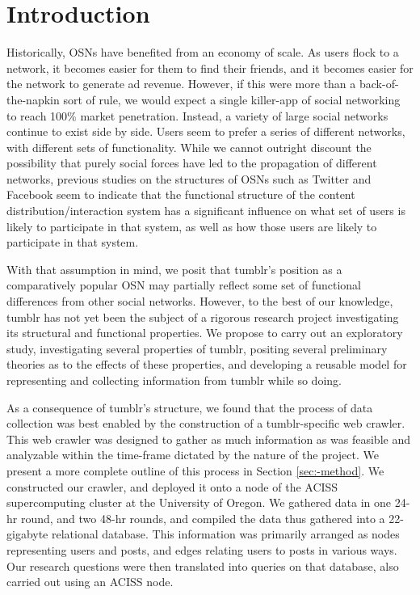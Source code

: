 \section{Introduction}
\label{sec:-intro}


Historically, OSNs have benefited from an economy of scale.  As users 
flock to a network, it becomes easier for them to find their friends, 
and it becomes easier for the network to generate ad revenue.  However, 
if this were more than a back-of-the-napkin sort of rule, we would 
expect a single killer-app of social networking to reach 100\% market 
penetration.  Instead, a variety of large social networks continue 
to exist side by side.  Users seem to prefer a series of different 
networks, with different sets of functionality.  While we cannot 
outright discount the possibility that purely social forces have led to the 
propagation of different networks, previous studies on the structures 
of OSNs such as Twitter\cite{kwak2010twitter} and Facebook\cite{viswanath2009evolution}
seem to indicate that the functional structure of the content 
distribution/interaction system has a significant influence on what set of 
users is likely to participate in that system, as well as how those users 
are likely to participate in that system.


With that assumption in mind, we posit that tumblr's position as a 
comparatively popular OSN may partially reflect some 
set of functional differences from other social networks.  However, to 
the best of our knowledge, tumblr has not yet been the subject of 
a rigorous research project investigating its structural 
and functional properties.  We propose to carry out an exploratory study, 
investigating several properties of tumblr, positing several preliminary 
theories as to the effects of these properties, and developing a reusable 
model for representing and collecting information from tumblr while so 
doing.

As a consequence of tumblr's structure, we found that the process of 
data collection was best enabled by the construction of a 
tumblr-specific web crawler.  This web crawler was designed to gather 
as much information as was feasible and analyzable within the time-frame 
dictated by the nature of the project.  We present a more complete 
outline of this process in Section \ref{sec:-method}.  We constructed 
our crawler, and deployed it onto a node of the ACISS supercomputing 
cluster at the University of Oregon.  We gathered data in one 24-hr 
round, and two 48-hr rounds, and compiled the data thus gathered into a 
22-gigabyte relational database.  This information was primarily arranged 
as nodes representing users and posts, and edges relating users to 
posts in various ways. Our research questions were then translated into 
queries on that database, also carried out using an ACISS node.

